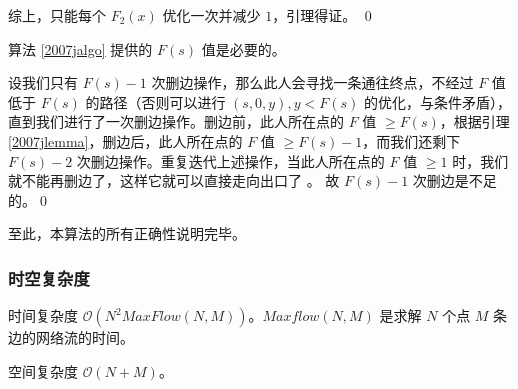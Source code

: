 \begin{pf}
					综上，只能每个 $F_2(x)$ 优化一次并减少 $1$，引理得证。 \qed

				\end{pf}
				
				\begin{theorem}
						算法 \ref{2007jalgo} 提供的 $F(s)$ 值是必要的。
				\end{theorem}
				\begin{pf}
					设我们只有 $F(s) - 1$ 次删边操作，那么此人会寻找一条通往终点，不经过 $F$ 值低于 $F(s)$ 的路径（否则可以进行 $(s, 0, y), y < F(s)$ 的优化，与条件矛盾），直到我们进行了一次删边操作。删边前，此人所在点的 $F$ 值 $ \ge F(s)$，根据引理 \ref{2007jlemma}，删边后，此人所在点的 $F$ 值 $ \ge F(s) - 1$，而我们还剩下 $F(s) - 2$ 次删边操作。重复迭代上述操作，当此人所在点的 $F$ 值 $ \ge 1$ 时，我们就不能再删边了，这样它就可以直接走向出口了 
					。
					故 $F(s) - 1$ 次删边是不足的。\qed
				\end{pf}
				至此，本算法的所有正确性说明完毕。
			\subsubsection{时空复杂度}
				时间复杂度 $\mathcal{O}\left( N^2 MaxFlow(N, M)\right)$。$Maxflow(N, M)$ 是求解 $N$ 个点 $M$ 条边的网络流的时间。
					
				空间复杂度 $\mathcal{O}\left(N + M\right)$。
				
		\newpage
					
				